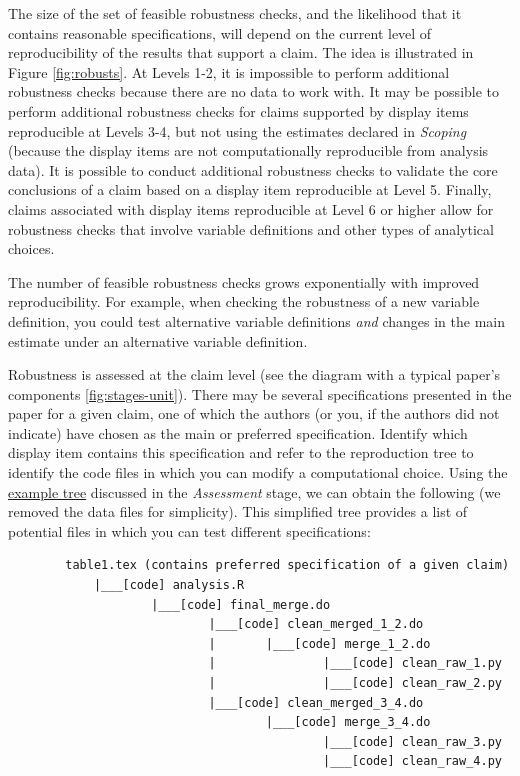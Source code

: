 \documentclass[
]{book}
\begin{document}
The size of the set of feasible robustness checks, and the likelihood that it contains reasonable specifications, will depend on the current level of reproducibility of the results that support a claim. The idea is illustrated in Figure \ref{fig:robusts}. At Levels 1-2, it is impossible to perform additional robustness checks because there are no data to work with. It may be possible to perform additional robustness checks for claims supported by display items reproducible at Levels 3-4, but not using the estimates declared in \emph{Scoping} (because the display items are not computationally reproducible from analysis data). It is possible to conduct additional robustness checks to validate the core conclusions of a claim based on a display item reproducible at Level 5. Finally, claims associated with display items reproducible at Level 6 or higher allow for robustness checks that involve variable definitions and other types of analytical choices.

The number of feasible robustness checks grows exponentially with improved reproducibility. For example, when checking the robustness of a new variable definition, you could test alternative variable definitions \emph{and} changes in the main estimate under an alternative variable definition.

Robustness is assessed at the claim level (see the diagram with a typical paper's components \ref{fig:stages-unit}). There may be several specifications presented in the paper for a given claim, one of which the authors (or you, if the authors did not indicate) have chosen as the main or preferred specification. Identify which display item contains this specification and refer to the reproduction tree to identify the code files in which you can modify a computational choice. Using the \protect\hyperlink{complete-tree}{example tree} discussed in the \emph{Assessment} stage, we can obtain the following (we removed the data files for simplicity). This simplified tree provides a list of potential files in which you can test different specifications:

\begin{verbatim}
        table1.tex (contains preferred specification of a given claim)
            |___[code] analysis.R
                    |___[code] final_merge.do
                            |___[code] clean_merged_1_2.do
                            |       |___[code] merge_1_2.do
                            |               |___[code] clean_raw_1.py
                            |               |___[code] clean_raw_2.py
                            |___[code] clean_merged_3_4.do
                                    |___[code] merge_3_4.do
                                            |___[code] clean_raw_3.py
                                            |___[code] clean_raw_4.py
\end{verbatim}
\end{document}
